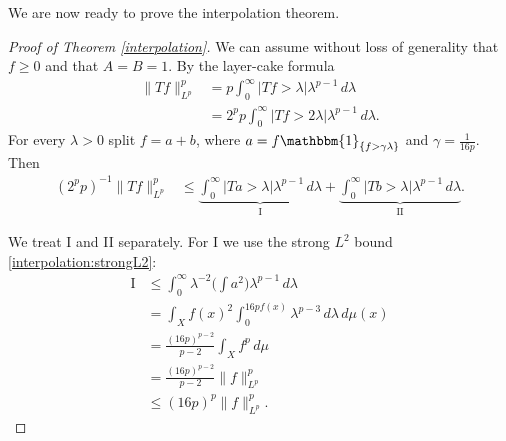\documentclass[oneside]{amsart}
\theoremstyle{definition}
\theoremstyle{plain}
\numberwithin{equation}{section}
\numberwithin{theorem}{section}
\newcommand{\ind}{\mathbbm{1}}
\begin{document}
We are now ready to prove the interpolation theorem.
\begin{proof}[Proof of Theorem \ref{interpolation}]
  We can assume without loss of generality that $f \geq 0$ and that
  $A = B =  1$.
  By the layer-cake formula
  \begin{align*}
    \|Tf\|_{L^p}^p &= p \int_0^\infty |Tf > \lambda| \lambda^{p-1} \, d\lambda\\
    &= 2^p p \int_0^\infty |Tf > 2\lambda| \lambda^{p-1} \, d\lambda.
  \end{align*}
  For every $\lambda > 0$ split $f = a + b$, where
  $a = f \ind_{\{f > \gamma \lambda\}}$ and $\gamma = \frac{1}{16p}$.
  Then
  \begin{align*}
    (2^p p)^{-1}\|Tf\|_{L^p}^p &\leq
    \underbrace{\int_0^\infty |Ta > \lambda| \lambda^{p-1} \, d\lambda}_{
      \text{I}} +
    \underbrace{\int_0^\infty |Tb > \lambda| \lambda^{p-1} \, d\lambda}_{
      \text{II}}.
  \end{align*}

  We treat I and II separately. For I we use the strong $L^2$ bound
  \eqref{interpolation:strongL2}:
  \begin{align*}
    \text{I} &\leq \int_0^\infty
      \lambda^{-2} \bigg( \int a^2 \bigg) \lambda^{p-1} \, d\lambda \\
    &= \int_X f(x)^2 \int_0^{16pf(x)} \lambda^{p-3} \, d\lambda \, d\mu(x) \\
    &= \frac{(16p)^{p-2}}{p-2} \int_X f^{p} \, d\mu \\
    &= \frac{(16p)^{p-2}}{p-2} \|f\|_{L^p}^p \\
    &\leq (16p)^p \|f\|_{L^p}^p.
  \end{align*}


\end{proof}
\end{document}
